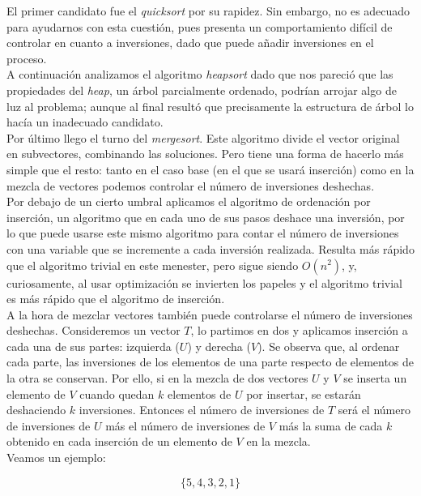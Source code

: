 El primer candidato fue el \textit{quicksort} por su rapidez. Sin embargo, no es adecuado para ayudarnos con esta cuestión, pues presenta un comportamiento difícil de controlar en cuanto a inversiones, dado que puede añadir inversiones en el proceso. \\

A continuación analizamos el algoritmo \textit{heapsort} dado que nos pareció que las propiedades del \textit{heap}, un árbol parcialmente ordenado, podrían arrojar algo de luz al problema; aunque al final resultó que precisamente la estructura de árbol lo hacía un inadecuado candidato. \\

Por último llego el turno del \textit{mergesort}. Este algoritmo divide el vector original en subvectores, combinando las soluciones. Pero tiene una forma de hacerlo más simple que el resto: tanto en el caso base (en el que se usará inserción) como en la mezcla de vectores podemos controlar el número de inversiones deshechas. \\

Por debajo de un cierto umbral aplicamos el algoritmo de ordenación por inserción, un algoritmo que en cada uno de sus pasos deshace una inversión, por lo que puede usarse este mismo algoritmo para contar el número de inversiones con una variable que se incremente a cada inversión realizada. Resulta más rápido que el algoritmo trivial en este menester, pero sigue siendo $O(n^2)$, y, curiosamente, al usar optimización se invierten los papeles y el algoritmo trivial es más rápido que el algoritmo de inserción. \\

A la hora de mezclar vectores también puede controlarse el número de inversiones deshechas. Consideremos un vector $T$, lo partimos en dos y aplicamos inserción a cada una de sus partes: izquierda ($U$) y derecha ($V$). Se observa que, al ordenar cada parte, las inversiones de los elementos de una parte respecto de elementos de la otra se conservan. Por ello, si en la mezcla de dos vectores $U$ y $V$ se inserta un elemento de $V$ cuando quedan $k$ elementos de $U$ por insertar, se estarán deshaciendo $k$ inversiones. Entonces el número de inversiones de $T$ será el número de inversiones de $U$ más el número de inversiones de $V$ más la suma de cada $k$ obtenido en cada inserción de un elemento de $V$ en la mezcla.\\

Veamos un ejemplo:

$$ \{5,4,3,2,1\}$$

